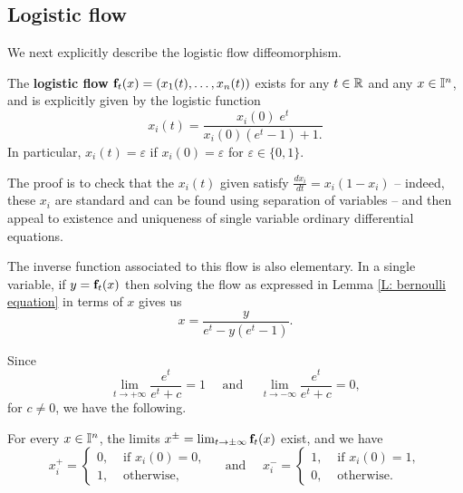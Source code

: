 \subsection{Logistic flow}

We next explicitly describe the logistic flow diffeomorphism.

\begin{lemma}\label{L: bernoulli equation}
	The {\bf logistic flow} $\mathbf{f}_t(x) = (x_1(t), \dots, x_n(t))$ exists for any $t \in \mathbb{R}$ and any $x \in \mathbb{I}^n$,
	and is explicitly given by the logistic function
	\begin{equation*}
		x_i(t) = \frac{x_i(0) \; e^t}{x_i(0)(e^t-1)+1.}
	\end{equation*}
	In particular, $x_i(t) = \varepsilon$ if $x_i(0) = \varepsilon$ for $\varepsilon \in \{0, 1\}$.
\end{lemma}

The proof is to check that the $x_i(t)$ given satisfy $\frac{d x_i}{dt} = x_i(1- x_i)$ -- indeed, these $x_i$ are standard and can be found using separation of variables -- and then appeal to existence and uniqueness of single variable ordinary differential equations.

The inverse function associated to this flow is also elementary. In a single variable, if $y = \mathbf{f}_t(x)$ then solving the flow as expressed in Lemma \ref{L: bernoulli equation} in terms of $x$ gives us
\begin{equation}\label{E: inverse flow}
	x = \frac{y}{e^t - y(e^t-1)}.
\end{equation}

Since
\begin{equation*}
	\lim_{t \to + \infty} \frac{e^t}{e^t + c} = 1
	\quad \text{ and } \quad
	\lim_{t \to - \infty} \frac{e^t}{e^t + c} = 0,
\end{equation*}
for $c\neq 0$, we have the following.

\begin{corollary}\label{C: limit of points along the flow}
	For every $x \in \mathbb{I}^n$, the limits $x^\pm = \lim_{t \to \pm \infty} \mathbf{f}_t(x)$ 	exist, and we have
	\begin{equation*}
		x^+_i = \begin{cases}
			0, & \text{ if } x_i(0) = 0, \\ 1, & \text{ otherwise,}
		\end{cases}
		\quad \text{ and } \quad
		x^-_i = \begin{cases}
			1, & \text{ if } x_i(0) = 1, \\ 0, & \text{ otherwise.}
		\end{cases}
	\end{equation*}
\end{corollary}

